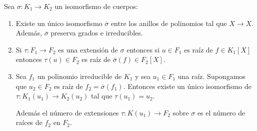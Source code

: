 \begin{proposition}
	Sea $\sigma:K_1 \to K_2$ un isomorfismo de cuerpos:
	
	\begin{enumerate}
		\item Existe un único isomorfismo $\overline{\sigma}$ entre los anillos de polinomios tal que $X \to X$. Además, $\overline{\sigma}$ preserva grados e irreducibles.  
		\item Si $\tau:F_1 \to F_2$ es una extensión de $\sigma$ entonces si $u \in F_1$ es raíz de $f \in K_1[X]$ entonces $\tau(u) \in F_2$ es raíz de $\overline{\sigma}(f) \in F_2[X]$. 	
		\item Sea $f_1$ un polinomio irreducible de $K_1$ y sea $u_1 \in F_1$ una raíz. Supongamos que $u_2 \in F_2$ es raíz de $f_2 = \overline{\sigma}(f_1)$. Entonces existe un único isomorfismo de $\tau: K_1(u_1) \to K_2(u_2)$ tal que $\tau(u_1) = u_2$.
		
		Además el número de extensiones $\tau:K(u_1) \to F_2$ sobre $\sigma$ es el número de raíces de $f_2$ en $F_2$.
	
		
	\end{enumerate}
\end{proposition}
